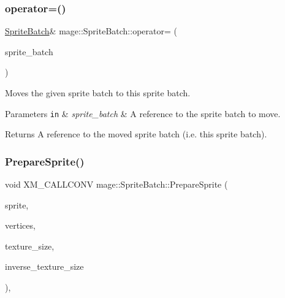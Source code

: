 \subsubsection{\texorpdfstring{operator=()}{operator=()}\hspace{0.1cm}{\footnotesize\ttfamily [2/2]}}
{\footnotesize\ttfamily \hyperlink{classmage_1_1_sprite_batch}{Sprite\+Batch}\& mage\+::\+Sprite\+Batch\+::operator= (\begin{DoxyParamCaption}\item[{\hyperlink{classmage_1_1_sprite_batch}{Sprite\+Batch} \&\&}]{sprite\+\_\+batch }\end{DoxyParamCaption})\hspace{0.3cm}{\ttfamily [delete]}}

Moves the given sprite batch to this sprite batch.


\begin{DoxyParams}[1]{Parameters}
\mbox{\tt in}  & {\em sprite\+\_\+batch} & A reference to the sprite batch to move. \\
\hline
\end{DoxyParams}
\begin{DoxyReturn}{Returns}
A reference to the moved sprite batch (i.\+e. this sprite batch). 
\end{DoxyReturn}
\hypertarget{classmage_1_1_sprite_batch_ade27cb47058823566f360356c1e245ec}{}\label{classmage_1_1_sprite_batch_ade27cb47058823566f360356c1e245ec} 
\subsubsection{\texorpdfstring{Prepare\+Sprite()}{PrepareSprite()}}
{\footnotesize\ttfamily void X\+M\+\_\+\+C\+A\+L\+L\+C\+O\+NV mage\+::\+Sprite\+Batch\+::\+Prepare\+Sprite (\begin{DoxyParamCaption}\item[{const \hyperlink{structmage_1_1_sprite_info}{Sprite\+Info} $\ast$}]{sprite,  }\item[{\hyperlink{structmage_1_1_vertex_position_color_texture}{Vertex\+Position\+Color\+Texture} $\ast$}]{vertices,  }\item[{F\+X\+M\+V\+E\+C\+T\+OR}]{texture\+\_\+size,  }\item[{F\+X\+M\+V\+E\+C\+T\+OR}]{inverse\+\_\+texture\+\_\+size }\end{DoxyParamCaption})\hspace{0.3cm}{\ttfamily [private]}, {\ttfamily [noexcept]}}

